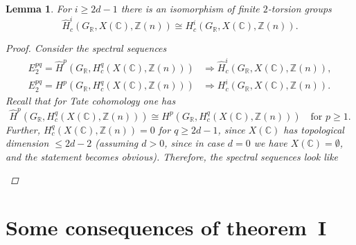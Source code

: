 \documentclass[leqno,12pt]{article}
\theoremstyle{plain}
\newtheorem{lemma}[theorem]{\indent\sc Lemma}
\theoremstyle{definition}
\newcommand{\CC}{\mathbb{C}}
\newcommand{\RR}{\mathbb{R}}
\newcommand{\ZZ}{\mathbb{Z}}
\begin{document}
\begin{lemma}
  \label{lemma:Tate-vs-normal-cohomology-of-X(C)}
  For $i \ge 2d - 1$ there is an isomorphism of finite $2$-torsion groups
  \[ \widehat{H}^i_c (G_\RR, X (\CC), \ZZ(n)) \cong
    H^i_c (G_\RR, X (\CC), \ZZ(n)). \]

  \begin{proof}
    Consider the spectral sequences
    \begin{align*}
      E^{pq}_2 = \widehat{H}^p (G_\RR, H^q_c (X (\CC), \ZZ(n))) & \Longrightarrow
      \widehat{H}^i_c (G_\RR, X (\CC), \ZZ(n)), \\
      E^{pq}_2 = H^p (G_\RR, H^q_c (X (\CC), \ZZ(n))) & \Longrightarrow
      H^i_c (G_\RR, X (\CC), \ZZ(n)).
    \end{align*}
    Recall that for Tate cohomology one has
    \[ \widehat{H}^p (G_\RR, H^q_c (X (\CC), \ZZ(n))) \cong
      H^p (G_\RR, H^q_c (X (\CC), \ZZ(n)))
      \quad\text{for }p \ge 1. \]
    Further, $H^q_c (X (\CC), \ZZ(n)) = 0$
    for $q \ge 2d-1$, since $X (\CC)$ has topological dimension $\le 2d - 2$
    (assuming $d > 0$, since in case $d = 0$ we have $X (\CC) = \emptyset$, and
    the statement becomes obvious).  Therefore, the spectral sequences look like
    \begin{center}
    \end{center}
  \end{proof}
\end{lemma}


\section{Some consequences of theorem~I}
\label{sec:consequences-of-theorem-I}
\end{document}

